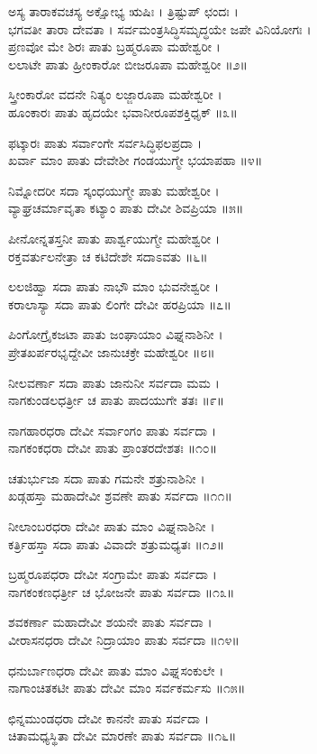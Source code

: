 ಅಸ್ಯ ತಾರಾಕವಚಸ್ಯ ಅಕ್ಷೋಭ್ಯ ಋಷಿಃ । ತ್ರಿಷ್ಟುಪ್ ಛಂದಃ ।\\
ಭಗವತೀ ತಾರಾ ದೇವತಾ । ಸರ್ವಮಂತ್ರಸಿದ್ಧಿಸಮೃದ್ಧಯೇ ಜಪೇ ವಿನಿಯೋಗಃ ।\\
ಪ್ರಣವೋ ಮೇ ಶಿರಃ ಪಾತು ಬ್ರಹ್ಮರೂಪಾ ಮಹೇಶ್ವರೀ ।\\
ಲಲಾಟೇ ಪಾತು ಹ್ರೀಂಕಾರೋ ಬೀಜರೂಪಾ ಮಹೇಶ್ವರೀ ॥೨॥

ಸ್ತ್ರೀಂಕಾರೋ ವದನೇ ನಿತ್ಯಂ ಲಜ್ಜಾರೂಪಾ ಮಹೇಶ್ವರೀ ।\\
ಹೂಂಕಾರಃ ಪಾತು ಹೃದಯೇ ಭವಾನೀರೂಪಶಕ್ತಿಧೃಕ್ ॥೩॥

ಫಟ್ಕಾರಃ ಪಾತು ಸರ್ವಾಂಗೇ ಸರ್ವಸಿದ್ಧಿಫಲಪ್ರದಾ ।\\
ಖರ್ವಾ ಮಾಂ ಪಾತು ದೇವೇಶೀ ಗಂಡಯುಗ್ಮೇ ಭಯಾಪಹಾ ॥೪॥

ನಿಮ್ನೋದರೀ ಸದಾ ಸ್ಕಂಧಯುಗ್ಮೇ ಪಾತು ಮಹೇಶ್ವರೀ ।\\
ವ್ಯಾಘ್ರಚರ್ಮಾವೃತಾ ಕಟ್ಯಾಂ ಪಾತು ದೇವೀ ಶಿವಪ್ರಿಯಾ ॥೫॥

ಪೀನೋನ್ನತಸ್ತನೀ ಪಾತು ಪಾರ್ಶ್ವಯುಗ್ಮೇ ಮಹೇಶ್ವರೀ ।\\
ರಕ್ತವರ್ತುಲನೇತ್ರಾ ಚ ಕಟಿದೇಶೇ ಸದಾಽವತು ॥೬॥

ಲಲಜಿಹ್ವಾ ಸದಾ ಪಾತು ನಾಭೌ ಮಾಂ ಭುವನೇಶ್ವರೀ ।\\
ಕರಾಲಾಸ್ಯಾ ಸದಾ ಪಾತು ಲಿಂಗೇ ದೇವೀ ಹರಪ್ರಿಯಾ ॥೭॥

ಪಿಂಗೋಗ್ರೈಕಜಟಾ ಪಾತು ಜಂಘಾಯಾಂ ವಿಘ್ನನಾಶಿನೀ ।\\
ಪ್ರೇತಖರ್ಪರಭೃದ್ದೇವೀ ಜಾನುಚಕ್ರೇ ಮಹೇಶ್ವರೀ ॥೮॥

ನೀಲವರ್ಣಾ ಸದಾ ಪಾತು ಜಾನುನೀ ಸರ್ವದಾ ಮಮ ।\\
ನಾಗಕುಂಡಲಧರ್ತ್ರೀ ಚ ಪಾತು ಪಾದಯುಗೇ ತತಃ ॥೯॥

ನಾಗಹಾರಧರಾ ದೇವೀ ಸರ್ವಾಂಗಂ ಪಾತು ಸರ್ವದಾ ।\\
ನಾಗಕಂಕಧರಾ ದೇವೀ ಪಾತು ಪ್ರಾಂತರದೇಶತಃ ॥೧೦॥

ಚತುರ್ಭುಜಾ ಸದಾ ಪಾತು ಗಮನೇ ಶತ್ರುನಾಶಿನೀ ।\\
ಖಡ್ಗಹಸ್ತಾ ಮಹಾದೇವೀ ಶ್ರವಣೇ ಪಾತು ಸರ್ವದಾ ॥೧೧॥

ನೀಲಾಂಬರಧರಾ ದೇವೀ ಪಾತು ಮಾಂ ವಿಘ್ನನಾಶಿನೀ ।\\
ಕರ್ತ್ರಿಹಸ್ತಾ ಸದಾ ಪಾತು ವಿವಾದೇ ಶತ್ರುಮಧ್ಯತಃ ॥೧೨॥

ಬ್ರಹ್ಮರೂಪಧರಾ ದೇವೀ ಸಂಗ್ರಾಮೇ ಪಾತು ಸರ್ವದಾ ।\\
ನಾಗಕಂಕಣಧರ್ತ್ರೀ ಚ ಭೋಜನೇ ಪಾತು ಸರ್ವದಾ ॥೧೩॥

ಶವಕರ್ಣಾ ಮಹಾದೇವೀ ಶಯನೇ ಪಾತು ಸರ್ವದಾ ।\\
ವೀರಾಸನಧರಾ ದೇವೀ ನಿದ್ರಾಯಾಂ ಪಾತು ಸರ್ವದಾ ॥೧೪॥

ಧನುರ್ಬಾಣಧರಾ ದೇವೀ ಪಾತು ಮಾಂ ವಿಘ್ನಸಂಕುಲೇ ।\\
ನಾಗಾಂಚಿತಕಟೀ ಪಾತು ದೇವೀ ಮಾಂ ಸರ್ವಕರ್ಮಸು ॥೧೫॥

ಛಿನ್ನಮುಂಡಧರಾ ದೇವೀ ಕಾನನೇ ಪಾತು ಸರ್ವದಾ ।\\
ಚಿತಾಮಧ್ಯಸ್ಥಿತಾ ದೇವೀ ಮಾರಣೇ ಪಾತು ಸರ್ವದಾ ॥೧೬॥

